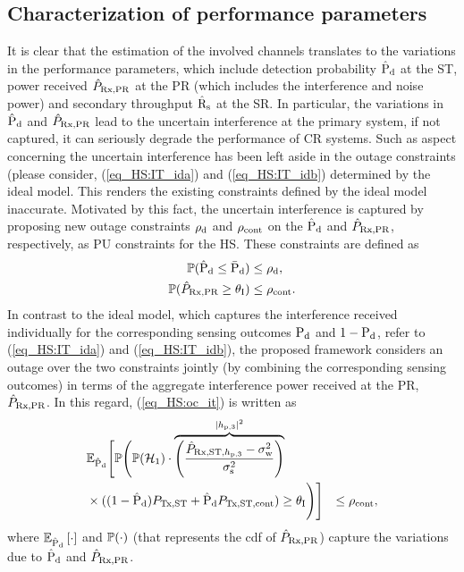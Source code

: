 \subsection{Characterization of performance parameters}
It is clear that the estimation of the involved channels translates to the variations in the performance parameters, which include detection probability $\hat{\text{P}}_{\text{d}}$ at the ST, power received $\hat{P}_{\text{Rx,PR}}$ at the PR (which includes the interference and noise power) and secondary throughput $\hat{\text{{R}}}_{\text{s}}$ at the SR. In particular, the variations in $\hat{\text{P}}_{\text{d}}$ and $\hat{P}_{\text{Rx,PR}}$ lead to the uncertain interference at the primary system, if not captured, it can seriously degrade the performance of CR systems. Such as aspect concerning the uncertain interference has been left aside in the outage constraints (please consider, (\ref{eq_HS:IT_ida}) and (\ref{eq_HS:IT_idb}) determined by the ideal model. This renders the existing constraints defined by the ideal model inaccurate. 
Motivated by this fact, the uncertain interference is captured by proposing new outage constraints $\rho_{\text{d}}$ and $\rho_{\text{cont}}$ on the $\hat{\text{P}}_{\text{d}}$ and $\hat{P}_{\text{Rx,PR}}$, respectively, as PU constraints for the HS. These constraints are defined as  
\begin{align}
\mathbb P(\hat{\text{P}}_{\text{d}} \le \bar{\text{P}}_{\text{d}}) &\le \rho_{\text{d}} \label{eq_HS:oc_pd}, \\
\mathbb P(\hat{P}_{\text{Rx,PR}} \ge \theta_{\text{I}}) &\le \rho_{\text{cont}} \label{eq_HS:oc_it}.
\end{align}   
In contrast to the ideal model, which captures the interference received individually for the corresponding sensing outcomes $\text{P}_{\text{d}}$ and  $1- \text{P}_{\text{d}}$, refer to (\ref{eq_HS:IT_ida}) and (\ref{eq_HS:IT_idb}), the proposed framework considers an outage over the two constraints jointly (by combining the corresponding sensing outcomes) in terms of the aggregate interference power received at the PR, $\hat{P}_{\text{Rx,PR}}$. In this regard, (\ref{eq_HS:oc_it}) is written as 
\begin{align}
& \mathbb{E}_{\hat{\text{P}}_{\text{d}}} \Bigg[ \mathbb P \Bigg( \mathbb P(\mathcal{H}_1) \cdot \smash[b]{\overbrace{\left( \frac{\hat{P}_{\text{Rx,ST,$h_{\text{p,3}}$}} - \sigma^2_{\text{w}}}{\sigma^2_{\text{s}}} \right)}^{|h_{\text{p,3}}|^2}} \nonumber \\ & \times ((1 - \hat{\text{P}}_{\text{d}}) P_{\text{Tx,ST}} + \hat{\text{P}}_{\text{d}} P_{\text{Tx,ST,cont}}) \ge \theta_{\text{I}} \Bigg) \Bigg] &\le \rho_{\text{cont}} \label{eq_HS:oc_it_def}, 
\end{align}
where ${\mathbb E}_{\hat{\text{P}}_{\text{d}}}\left[ \cdot \right]$ and $\mathbb P(\cdot)$ (that represents the cdf of $\hat{P}_{\text{Rx,PR}}$) capture the variations due to $\hat{\text{P}}_{\text{d}}$ and $\hat{P}_{\text{Rx,PR}}$. 
